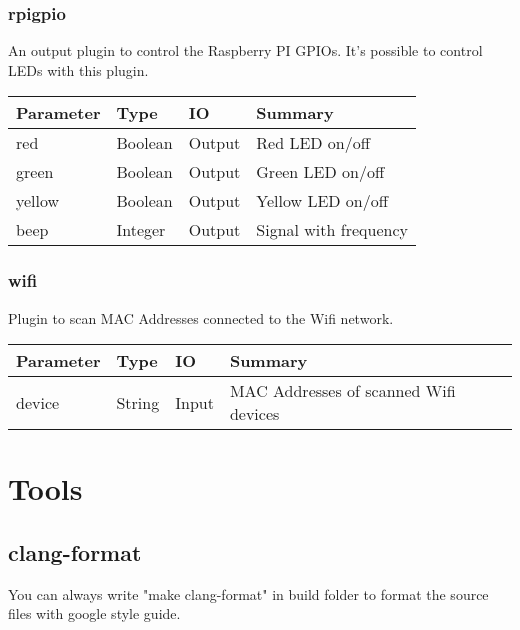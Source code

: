 \documentclass[english,a4paper,11pt]{report}
\begin{document}
\subsection{rpigpio}
An output plugin to control the Raspberry PI GPIOs.
It's possible to control LEDs with this plugin.

\begin{center}
	\begin{tabular}{| l | l | l | l |}
		\hline
		Parameter & Type & IO & Summary \\ \hline
		red & Boolean & Output & Red LED on/off \\
		green & Boolean & Output & Green LED on/off \\
		yellow & Boolean & Output & Yellow LED on/off \\
		beep & Integer & Output & Signal with frequency \\
		\hline
	\end{tabular}
\end{center}

\subsection{wifi}
Plugin to scan MAC Addresses connected to the Wifi network.

\begin{center}
	\begin{tabular}{| l | l | l | l |}
		\hline
		Parameter & Type & IO & Summary \\ \hline
		device & String & Input & MAC Addresses of scanned Wifi devices \\
		\hline
	\end{tabular}
\end{center}

\chapter{Tools}
\section{clang-format}
You can always write "make clang-format" in build folder to format the source files with google style guide.
\end{document}
